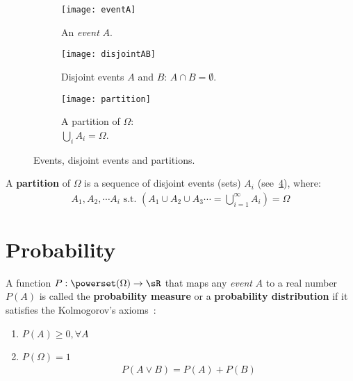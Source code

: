 \begin{figure}
	[hbt!] \centering
	\begin{subfigure}
		[t]{.3
		\textwidth} \centering
		\texttt{[image: eventA]}
		\caption{An \emph{event} \(A\).}\label{fig:event_A}
	\end{subfigure}
		\hfill
	\begin{subfigure}
			[t]{.3
			\textwidth} \centering
			\texttt{[image: disjointAB]}
			\caption{Disjoint events \(A\) and \(B\): \(A \cap B = \emptyset\).}\label{fig:disjoint_events}
	\end{subfigure}
	\hfill
	\begin{subfigure}
		[t]{.3
		\textwidth} \centering
		\texttt{[image: partition]}
		\caption{A partition of \(\Omega\):\\
		\(\bigcup\limits_{i}^{} A_i = \Omega\).}\label{fig:partition}
	\end{subfigure}
	\caption{Events, disjoint events and partitions.}
\end{figure}
A \textbf{partition} of $\Omega$ is a sequence of disjoint events (sets) \(A_i\) (see~\cref{fig:partition}), where:
\begin{align}
	A_1, A_2, \cdots A_i \text{ s.t. } (A_1 \cup A_2 \cup A_3 \cdots = \bigcup\limits_{i=1}^{\infty} A_i) = \Omega
\end{align}


\section{Probability}\label{sec:probability}
\begin{definition}\label{sec:kolmogorov_axioms}
	A function \(P: \powerset(\Omega) \to \sR \) that maps any \emph{event} \(A\) to a real number \(P(A)\) is called the \textbf{probability measure} or a \textbf{probability distribution} if it satisfies the Kolmogorov's axioms~\cite{wasserman:2013}:
	\begin{enumerate}[\textbf{Axiom} 1., leftmargin=3cm]
		\item \(P(A)\geq 0, \forall A\)
		\item \(P(\Omega)=1\)
		\begin{align}
			P(A \lor B)= P(A)+P(B)\label{eq:sum_rule} \\
			\nonumber \tag{Sum Rule}
		\end{align}
	\end{enumerate}
\end{definition}

